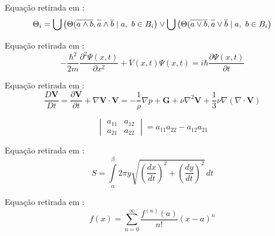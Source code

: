 \begin{prob}
\label{prob11}
Equação retirada em \cite{gratzer2007more}:
\begin{equation*}
    \Theta_{i} = \bigcup \big( \Theta (\overline{a \wedge b}, \overline{\vphantom{b}a}\wedge \overline{b} \mid a,\ b \in B_{i} \big) \vee \bigcup \big( \Theta (\overline{a \vee b}, \overline{\vphantom{b}a}\vee \overline{b} \mid a,\ b \in B_{i} \big)
\end{equation*}
\end{prob}

\begin{prob}
\label{prob12}
Equação retirada em \cite{Tiago}:
\begin{equation*}
     -\frac{\hbar^{2}}{2 m}\frac{\partial^{2}\Psi(x,t)}{\partial x^2} + V(x,t)\Psi(x,t)=i\hbar\frac{\partial\Psi(x,t)}{\partial t}
\end{equation*}
\end{prob}

\begin{prob}
\label{prob13}
Equação retirada em \cite{Balino}:
\begin{equation*}
     \frac{D\mathbf{V}}{Dt} = \frac{\partial \mathbf{V}}{\partial t} + \nabla \mathbf{V}\cdot \mathbf{V} = -\frac{1}{\rho}\nabla p + \mathbf{G} + \nu\nabla^{2}\mathbf{V} + \frac{1}{3}\nu\nabla (\nabla\cdot\mathbf{V})
\end{equation*}
\end{prob}

\begin{prob}
\label{prob14}
\begin{equation*}
     \begin{vmatrix}
                a_{11} & a_{12} \\
                a_{21} & a_{22}
            \end{vmatrix}
            = a_{11}a_{22} - a_{12}a_{21}
\end{equation*}
\end{prob}

\begin{prob}
\label{prob15}
Equação retirada em \cite{stewart2013calculo}:
\begin{equation*}
      S = \int\limits_{\alpha}^{\beta} 2\pi y\sqrt{\left(\dfrac{dx}{dt}\right)^{2} + \left(\dfrac{dy}{dt}\right)^{2}} \, dt
\end{equation*}
\end{prob}

\begin{prob}
\label{prob16}
Equação retirada em \cite{stewart2013calculo}:
\begin{equation*}
      f(x) = \sum_{n=0}^{\infty}\frac{f^{(n)}(a)}{n!}(x-a)^{n}
\end{equation*}
\end{prob}

